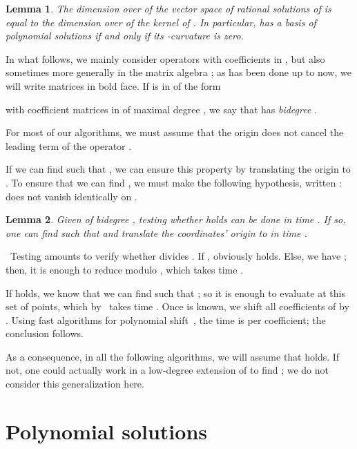 \documentclass{sig-alternate}
\def\myproof{\noindent{\sc Proof.}~}
\def\foorp{\hfill}
\newtheorem{Lemma}{Lemma}
\begin{document}
\begin{Lemma}\label{lemma:pcurv-vs-ratsols}
  The dimension over  of the vector space of rational
  solutions of  is equal to the dimension over  of the
  kernel of .  In particular,  has a basis of polynomial
  solutions if and only if its -curvature is zero.
\end{Lemma}

\smallskip{} In what follows, we mainly
consider operators with coefficients in , but also sometimes
more generally in the  matrix algebra
;  as has been done up to now, we will write 
matrices in bold face. If  is in
 of the form

with coefficient matrices  in  of
maximal degree , we say that  has {\em bidegree} . 

\smallskip{} For most of our algorithms,
we must assume that the origin  does not cancel the leading term
 of the operator . 

If we can find  such that , we can
ensure this property by translating the origin to . To ensure that
we can find , we must make the following hypothesis, written :  does not vanish identically on .
\begin{Lemma}
  Given  of bidegree , testing whether  holds
  can be done in time . If so, one can find 
  such that  and translate the coordinates' origin
  to  in time .
\end{Lemma}
\myproof Testing  amounts to verify whether  divides
. If ,  obviously holds. Else, we
have ; then, it is enough to reduce  modulo , which
takes time .

If  holds, we know that we can find  such that ; so it is enough to evaluate
 at this set of points, which by~\cite[\S 10.1]{GaGe99} takes time
. Once  is known, we shift all coefficients of
 by . Using fast algorithms for polynomial shift~\cite{GaGe97},
the time is  per coefficient; the conclusion follows.
\foorp

\smallskip\noindent As a consequence, in all the following algorithms, we
will assume that  holds. If not, one could actually work in a
low-degree extension of  to find ; we do not consider this 
generalization here.




\section{Polynomial solutions}\label{sec:solpol}
\end{document}

